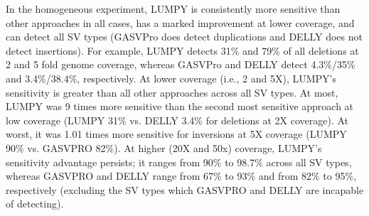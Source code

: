 \documentclass[10pt]{bmc_article}
\def\texttt{[image: ]}
\newenvironment{bmcformat}{\begin{raggedright}\baselineskip20pt\sloppy\setboolean{publ}{false}}{\end{raggedright}\baselineskip20pt\sloppy}
\begin{document}
\begin{bmcformat}
In the homogeneous experiment, LUMPY is consistently more sensitive than other
approaches in all cases, has a marked improvement at lower coverage, and can
detect all SV types (GASVPro does detect duplications and DELLY does not detect
insertions).   For example, LUMPY detects 31\% and 79\% of all deletions at 2
and 5 fold genome coverage, whereas GASVPro and DELLY detect 4.3\%/35\% and
3.4\%/38.4\%, respectively.  At lower coverage (i.e., 2 and 5X), LUMPY’s
sensitivity is greater than all other approaches across all SV types. At most,
LUMPY was 9 times more sensitive than the second most sensitive approach at low
coverage (LUMPY 31\% vs. DELLY 3.4\% for deletions at 2X coverage). At worst, it
was 1.01 times more sensitive for inversions at 5X coverage (LUMPY 90\% vs.
GASVPRO 82\%). At higher (20X and 50x) coverage, LUMPY’s sensitivity advantage
persists; it ranges from 90\% to 98.7\% across all SV types, whereas GASVPRO and
DELLY range from 67\% to 93\% and from 82\% to 95\%, respectively (excluding the
SV types which GASVPRO and DELLY are incapable of detecting).  





\end{bmcformat}
\end{document}
